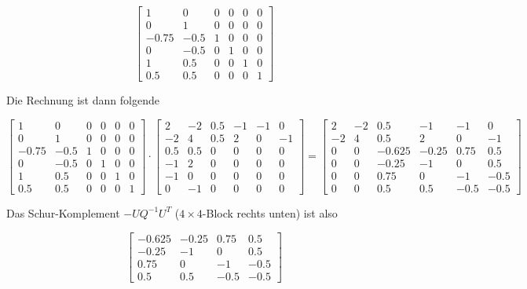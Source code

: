\documentclass[a4paper, 12pt]{report}
\begin{document}
$$ \begin{bmatrix}1 & 0 & 0 & 0 & 0 & 0\\0 & 1 & 0 & 0 & 0 & 0\\-0.75 & -0.5 & 1 & 0 & 0 & 0\\0 & -0.5 & 0 & 1 & 0 & 0\\1 & 0.5 & 0 & 0 & 1 & 0\\ 0.5 & 0.5 & 0 & 0 & 0 & 1\end{bmatrix} $$

Die Rechnung ist dann folgende

\begin{adjustwidth}{-55pt}{0pt}
$$ \begin{bmatrix}1 & 0 & 0 & 0 & 0 & 0\\0 & 1 & 0 & 0 & 0 & 0\\-0.75 & -0.5 & 1 & 0 & 0 & 0\\0 & -0.5 & 0 & 1 & 0 & 0\\1 & 0.5 & 0 & 0 & 1 & 0\\ 0.5 & 0.5 & 0 & 0 & 0 & 1\end{bmatrix} \cdot \begin{bmatrix}2 & -2 & 0.5 & -1 & -1 & 0\\-2 & 4 & 0.5 & 2 & 0 & -1\\0.5 & 0.5 & 0 & 0 & 0 & 0\\-1 & 2 & 0 & 0 & 0 & 0\\-1 & 0 & 0 & 0 & 0 & 0\\0 & -1 & 0 & 0 & 0 & 0\end{bmatrix} = \begin{bmatrix} 2 & -2 & 0.5 & -1 & -1 & 0\\-2 & 4 & 0.5 & 2 & 0 & -1\\ 0 & 0 & -0.625 & -0.25 & 0.75 & 0.5\\ 0 & 0 & -0.25 & -1 & 0 & 0.5\\0 & 0 & 0.75 & 0 & -1 & -0.5\\0 & 0 & 0.5 & 0.5 & -0.5 & -0.5 \end{bmatrix} $$
\end{adjustwidth}

Das Schur-Komplement $-UQ^{-1}U^T$ ($4 \times 4$-Block rechts unten) ist also

$$ \begin{bmatrix} -0.625 & -0.25 & 0.75 & 0.5\\ -0.25 & -1 & 0 & 0.5\\ 0.75 & 0 & -1 & -0.5\\0.5 & 0.5 & -0.5 & -0.5 \end{bmatrix} $$
\end{document}
